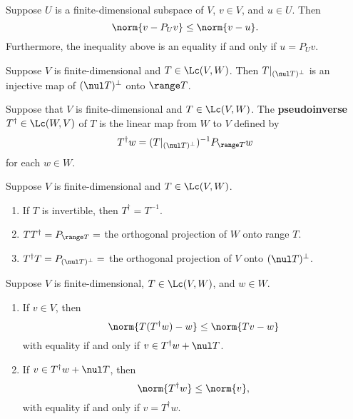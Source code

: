 \documentclass{extarticle}
\begin{document}
\begin{thm}
    Suppose \(U\) is a finite-dimensional subspace of \(V\), \(v \in V\), and \(u \in U\). Then
    \[\norm{v - P_U v} \leq \norm{v - u}.\]
    Furthermore, the inequality above is an equality if and only if \(u = P_U v\).
\end{thm}

\begin{lemma}
    Suppose \(V\) is finite-dimensional and \(T \in \Lc(V, W)\). Then \(T |_{(\nul T)^\perp}\) is an
    injective map of \((\nul T)^\perp\) onto \(\range T\).
\end{lemma}

\begin{definition}
    Suppose that \(V\) is finite-dimensional and \(T \in \Lc(V, W)\). The \textbf{pseudoinverse}
    \(T^\dagger \in \Lc(W, V)\) of \(T\) is the linear map from \(W\) to \(V\) defined by
    \[T^\dagger w = (T|_{(\nul T)^\perp})^{-1} P_{\range T} w\]
    for each \(w \in W\).
\end{definition}

\begin{corollary}
    Suppose \(V\) is finite-dimensional and \(T \in \Lc(V, W)\).
    \begin{enumerate}[label=(\alph*)]
        \item If \(T\) is invertible, then \(T^\dagger = T^{-1}\).
        \item \(T T^\dagger = P_{\range T} =\) the orthogonal projection of \(W\) onto range \(T\).
        \item \(T^\dagger T = P_{(\nul T)^\perp} = \) the orthogonal projection of \(V\) onto \((\nul T)^\perp\).
    \end{enumerate}
\end{corollary}

\begin{thm}
    Suppose \(V\) is finite-dimensional, \(T \in \Lc(V, W)\), and \(w \in W\).
    \begin{enumerate}[label=(\alph*)]
        \item If \(v \in V\), then
        \[\norm{T(T^\dagger w) - w} \leq \norm{Tv - w}\]
        with equality if and only if \(v \in T^\dagger w + \nul T\).

        \item If \(v \in T^\dagger w + \nul T\), then
        \[\norm{T^\dagger w} \leq \norm{v},\]
        with equality if and only if \(v = T^\dagger w\).
    \end{enumerate}
\end{thm}
\end{document}
